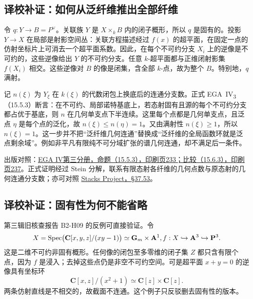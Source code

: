\endgroup


\hypertarget{D18-096-notes}{}
\begingroup
\def\OO{\mathcal O}\def\FF{\mathcal F}\def\GG{\mathcal G}
\def\PP{\mathbf P}\def\calP{\mathcal P}\def\dd{\delta}
\def\Div{\operatorname{Div}}\def\depth{\operatorname{depth}}
\def\pr{\operatorname{pr}}\def\coker{\operatorname{coker}}
\subsection*{译校补证：如何从泛纤维推出全部纤维}
令 $q:Y\to B=P^\vee$。关联族 $Y$ 是 $X\times_k B$ 内的闭子概形，所以 $q$ 是固有的。投影 $Y\to X$ 在局部是射影空间丛：关联方程描述经过 $f(x)$ 的超平面，在固定一点的仿射坐标片上可消去一个超平面系数。因此，在每个不可约分支 $X_i$ 上的逆像是不可约的，这些逆像给出 $Y$ 的不可约分支。任意 $k$-超平面都与正维闭射影集 $f(X_i)$ 相交。这些逆像对 $B$ 的像是闭集，含全部 $k$-点，故为整个 $B$。特别地，$q$ 满射。

记 $n(\xi)$ 为 $Y_\xi$ 在 $k(\xi)$ 的代数闭包上换底后的连通分支数。正式 EGA~IV\textsubscript{3}（15.5.3）断言：在不可约、局部诺特基底上，若态射固有且源的每个不可约分支都占优于基底，则 $n$ 在几何单支点下半连续。这里每个点都是几何单支点，且泛点 $\eta$ 是每个点的泛化，故 $n(\xi)\leq n(\eta)=1$。又由满射性 $n(\xi)\ge1$，所以 $n(\xi)=1$。这一步并不把“泛纤维几何连通”替换成“泛纤维的全局函数环就是泛点剩余域”。例如非平凡有限纯不可分域扩张的谱几何连通，却不满足后一条件。

出版对照：\href{https://www.numdam.org/item/PMIHES_1966__28__5_0/}{EGA IV第三分册，命题（15.5.3），印刷页233；比较（15.6.3），印刷页237}。正式证明经过 Stein 分解，联系有限态射各纤维的几何点数与原态射的几何连通分支数；亦可对照 \href{https://stacks.math.columbia.edu/tag/03GX}{Stacks Project，§37.53}。

\subsection*{译校补证：固有性为何不能省略}
第三辑旧核查报告 B2-H09 的反例可直接验证。令
\[
 X=\Spec\bigl(\mathbf C[x,y,z]/(xy-1)\bigr)
   \simeq \mathbf G_m\times\mathbf A^1,
 \qquad
 f:X\hookrightarrow\mathbf A^3\hookrightarrow\mathbf P^3.
\]
这是二维不可约非固有概形。任何像的闭包至多零维的闭子集 $Z$ 都只含有限个点，因为 $f$ 是浸入；去掉这些点仍是非空不可约空间。可是超平面 $x+y=0$ 的逆像具有坐标环
\[
 \mathbf C[x,z]/(x^2+1)\simeq \mathbf C[z]\times\mathbf C[z] .
\]
两条仿射直线是不相交的，故截面不连通。这个例子只反驳删去固有性的版本。

